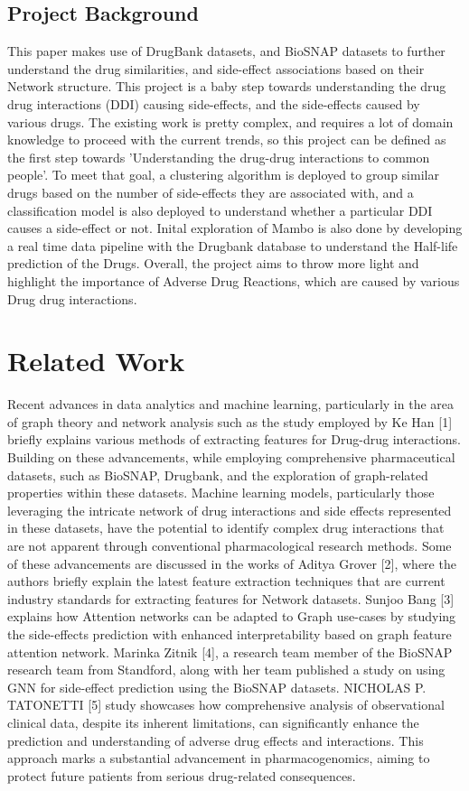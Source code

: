 \documentclass[journal,transmag]{J-NaNA}
\begin{document}
\subsection{Project Background}
This paper makes use of DrugBank datasets, and BioSNAP datasets to further understand the drug similarities, and side-effect associations based on their Network structure. This project is a baby step towards understanding the drug drug interactions (DDI) causing side-effects, and the side-effects caused by various drugs. The existing work is pretty complex, and requires a lot of domain knowledge to proceed with the current trends, so this project can be defined as the first step towards 'Understanding the drug-drug interactions to common people'. To meet that goal, a clustering algorithm is deployed to group similar drugs based on the number of side-effects they are associated with, and a classification model is also deployed to understand whether a particular DDI causes a side-effect or not. Inital exploration of Mambo is also done by developing a real time data pipeline with the Drugbank database to understand the Half-life prediction of the Drugs. Overall, the project aims to throw more light and highlight the importance of Adverse Drug Reactions, which are caused by various Drug drug interactions.


\section{Related Work}
Recent advances in data analytics and machine learning, particularly in the area of graph theory and network analysis such as the study employed by Ke Han [1] briefly explains various methods of extracting features for Drug-drug interactions. Building on these advancements, while employing comprehensive pharmaceutical datasets, such as BioSNAP, Drugbank, and the exploration of graph-related properties within these datasets. Machine learning models, particularly those leveraging the intricate network of drug interactions and side effects represented in these datasets, have the potential to identify complex drug interactions that are not apparent through conventional pharmacological research methods. Some of these advancements are discussed in the works of Aditya Grover [2], where the authors briefly explain the latest feature extraction techniques that are current industry standards for extracting features for Network datasets. Sunjoo Bang [3] explains how Attention networks can be adapted to Graph use-cases by studying the side-effects prediction with enhanced interpretability based on graph feature attention network. Marinka Zitnik [4], a research team member of the BioSNAP research team from Standford, along with her team published a study on using GNN for side-effect prediction using the BioSNAP datasets. NICHOLAS P. TATONETTI [5] study showcases how comprehensive analysis of observational clinical data, despite its inherent limitations, can significantly enhance the prediction and understanding of adverse drug effects and interactions. This approach marks a substantial advancement in pharmacogenomics, aiming to protect future patients from serious drug-related consequences.
\\
\end{document}
